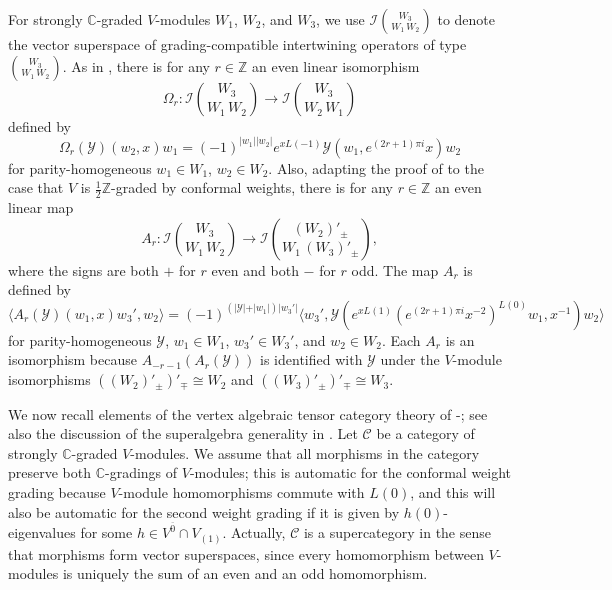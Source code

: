 \documentclass[11pt, reqno]{amsart}
\theoremstyle{definition}\newtheorem{defi}[thm]{Definition}
\theoremstyle{definition}\newtheorem{rem}[thm]{Remark}
\theoremstyle{definition}\newtheorem{exam}[thm]{Example}
\theoremstyle{definition}\newtheorem{assum}[thm]{Assumption}
\newcommand{\cY}{\mathcal{Y}}
\newcommand{\cI}{\mathcal{I}}
\newcommand{\cC}{\mathcal{C}}
\newcommand{\CC}{\mathbb{C}}
\newcommand{\ZZ}{\mathbb{Z}}
\newcommand{\even}{\overline{0}}
\begin{document}
For strongly $\CC$-graded $V$-modules $W_1$, $W_2$, and $W_3$, we use $\cI\binom{W_3}{W_1\,W_2}$ to denote the vector superspace of grading-compatible intertwining operators of type $\binom{W_3}{W_1\,W_2}$. As in \cite[Proposition 3.44]{HLZ2}, there is for any $r\in\ZZ$ an even linear isomorphism
\begin{equation*}
\Omega_r: \cI\binom{W_3}{W_1\,W_2}\longrightarrow\cI\binom{W_3}{W_2\,W_1}
\end{equation*}
defined by
\begin{equation*}
\Omega_r(\cY)(w_2,x)w_1= (-1)^{\vert w_1\vert\vert w_2\vert}e^{xL(-1)}\cY(w_1,e^{(2r+1)\pi i}x)w_2
\end{equation*}
for parity-homogeneous $w_1\in W_1$, $w_2\in W_2$. Also, adapting the proof of \cite[Proposition 3.46]{HLZ2} to the case that $V$ is $\frac{1}{2}\ZZ$-graded by conformal weights, there is for any $r\in \ZZ$ an even linear map
\begin{equation*}
A_r:\cI\binom{W_3}{W_1\,W_2} \longrightarrow\cI\binom{(W_2)'_\pm}{W_1\,(W_3)'_\pm},
\end{equation*}
where the signs are both $+$ for $r$ even and both $-$ for $r$ odd. The map $A_r$ is defined by
\begin{equation*}
\langle A_r(\cY)(w_1,x)w_3', w_2\rangle =(-1)^{(\vert\cY\vert+\vert w_1\vert)\vert w_3'\vert}\big\langle w_3',\cY(e^{xL(1)}(e^{(2r+1)\pi i}x^{-2})^{L(0)} w_1,x^{-1})w_2\big\rangle
\end{equation*}
for parity-homogeneous $\cY$, $w_1\in W_1$, $w_3'\in W_3'$, and $w_2\in W_2$. Each $A_r$ is an isomorphism because $A_{-r-1}(A_r(\cY))$ is identified with $\cY$ under the $V$-module isomorphisms $((W_2)'_{\pm})'_{\mp}\cong W_2$ and $((W_3)'_\pm)'_\mp\cong W_3$.

We now recall elements of the vertex algebraic tensor category theory of \cite{HLZ1}-\cite{HLZ8}; see also the discussion of the superalgebra generality in \cite[Section 3]{CKM-exts}. Let $\cC$ be a category of strongly $\CC$-graded $V$-modules. We assume that all morphisms in the category preserve both $\CC$-gradings of $V$-modules; this is automatic for the conformal weight grading  because $V$-module homomorphisms commute with $L(0)$, and  this will also be automatic for the second weight grading if it is given by $h(0)$-eigenvalues for some $h\in V^{\even}\cap V_{(1)}$. Actually, $\cC$ is a supercategory in the sense that morphisms form vector superspaces, since every homomorphism between $V$-modules is uniquely the sum of an even and an odd homomorphism.
\end{document}

